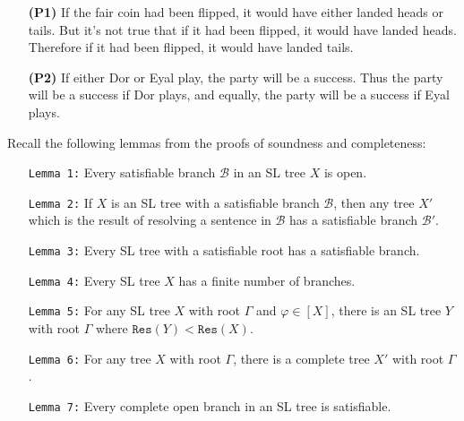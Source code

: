\documentclass[12pt]{article}
\newcommand{\B}{\mathcal{B}}
\newcommand{\res}{\texttt{Res}}
\begin{document}
\bigskip

\begin{enumerate}
  \item[\bf (P1)] If the fair coin had been flipped, it would have either landed heads or tails.
    But it's not true that if it had been flipped, it would have landed heads.
    Therefore if it had been flipped, it would have landed tails.
  \item[\bf (P2)] If either Dor or Eyal play, the party will be a success.
    Thus the party will be a success if Dor plays, and equally, the party will be a success if Eyal plays.
\end{enumerate}

\newpage


Recall the following lemmas from the proofs of soundness and completeness:

\begin{enumerate}
  \item[\tt Lemma 1:] Every satisfiable branch $\B$ in an SL tree $X$ is open. 
  \item[\tt Lemma 2:] If $X$ is an SL tree with a satisfiable branch $\B$, then any tree $X'$ which is the result of resolving a sentence in $\B$ has a satisfiable branch $\B'$.  
  \item[\tt Lemma 3:] Every SL tree with a satisfiable root has a satisfiable branch.
  \item[\tt Lemma 4:] Every SL tree $X$ has a finite number of branches.  
  \item[\tt Lemma 5:] For any SL tree $X$ with root $\Gamma$ and $\varphi\in[X]$, there is an SL tree $Y$ with root $\Gamma$ where $\res(Y)<\res(X)$. 
  \item[\tt Lemma 6:] For any tree $X$ with root $\Gamma$, there is a complete tree $X'$ with root $\Gamma$. 
  \item[\tt Lemma 7:] Every complete open branch in an SL tree is satisfiable.
\end{enumerate}
\end{document}
